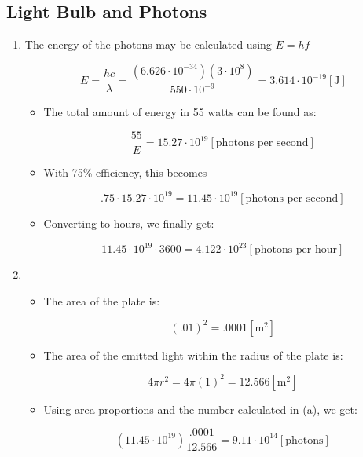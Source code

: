 \begin{enumerate}

    \section*{Light Bulb and Photons}

    \begin{enumerate}

      \item The energy of the photons may be calculated using $E=hf$

        $$E=\dfrac{hc}{\lambda}=\dfrac{\left(6.626\cdot10^{-34}\right)\left(3\cdot10^8\right)}{550\cdot10^{-9}}=3.614\cdot10^{-19}[\si{\joule}]$$
        \begin{itemize}

          \item The total amount of energy in 55 watts can be found as:

            $$\dfrac{55}{E}=15.27\cdot10^{19}[\text{photons per second}]$$

          \item With 75\% efficiency, this becomes

            $$.75\cdot15.27\cdot10^{19}=11.45\cdot10^{19}[\text{photons per second}]$$

          \item Converting to hours, we finally get:

            $$11.45\cdot10^{19}\cdot3600=4.122\cdot10^{23}[\text{photons per hour}]$$

        \end{itemize}

      \item

        \begin{itemize}

          \item The area of the plate is:

            $$(.01)^2=.0001[\si{\meter\squared}]$$

          \item The area of the emitted light within the radius of the plate is:

            $$4\pi r^2=4\pi(1)^2=12.566[\si{\meter\squared}]$$

          \item Using area proportions and the number calculated in (a), we get:

            $$\left(11.45\cdot10^{19}\right)\dfrac{.0001}{12.566}=9.11\cdot10^{14}[\text{photons}]$$


\end{itemize}
\end{enumerate}
\end{enumerate}

